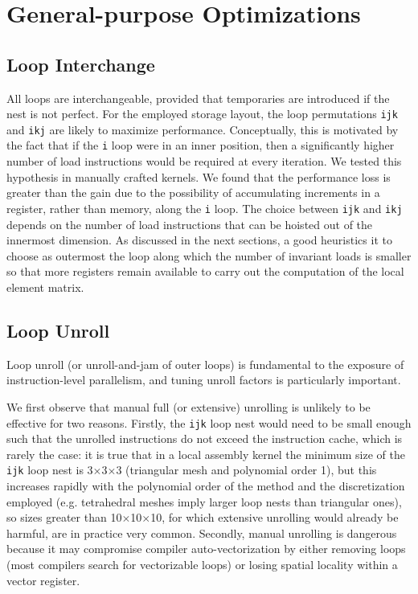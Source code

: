 \section{General-purpose Optimizations}
\label{sec:coffee-genpurp-opts}

\subsection{Loop Interchange}
\label{sec:coffee-genpurp-opts-interchange}
All loops are interchangeable, provided that temporaries are introduced if the nest is not perfect. For the employed storage layout, the loop permutations \texttt{ijk} and \texttt{ikj} are likely to maximize performance. Conceptually, this is motivated by the fact that if the \texttt{i} loop were in an inner position, then a significantly higher number of load instructions would be required at every iteration. We tested this hypothesis in manually crafted kernels. We found that the performance loss is greater than the gain due to the possibility of accumulating increments in a register, rather than memory, along the \texttt{i} loop. The choice between \texttt{ijk} and \texttt{ikj} depends on the number of load instructions that can be hoisted out of the innermost dimension. As discussed in the next sections, a good heuristics it to choose as outermost the loop along which the number of invariant loads is smaller so that more registers remain available to carry out the computation of the local element matrix.

\subsection{Loop Unroll}
Loop unroll (or unroll-and-jam of outer loops) is fundamental to the exposure of instruction-level parallelism, and tuning unroll factors is particularly important.

We first observe that manual full (or extensive) unrolling is unlikely to be effective for two reasons. Firstly, the \texttt{ijk} loop nest would need to be small enough such that the unrolled instructions do not exceed the instruction cache, which is rarely the case: it is true that in a local assembly kernel the minimum size of the \texttt{ijk} loop nest is 3$\times$3$\times$3 (triangular mesh and polynomial order 1), but this increases rapidly with the polynomial order of the method and the discretization employed (e.g. tetrahedral meshes imply larger loop nests than triangular ones), so sizes greater than 10$\times$10$\times$10, for which extensive unrolling would already be harmful, are in practice very common. Secondly, manual unrolling is dangerous because it may compromise compiler auto-vectorization by either removing loops (most compilers search for vectorizable loops) or losing spatial locality within a vector register.

